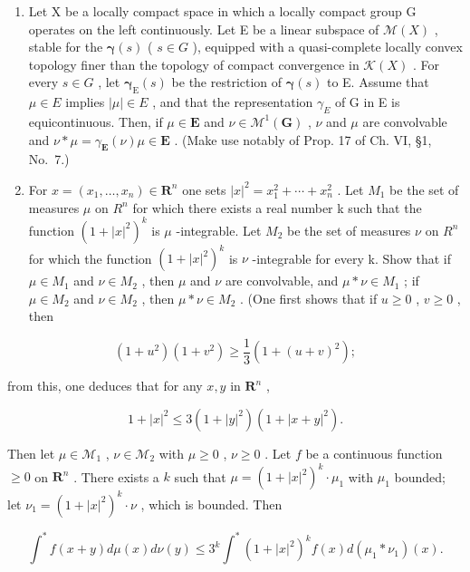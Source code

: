 \begin{enumerate}
\def\labelenumi{\arabic{enumi})}
\setcounter{enumi}{1}
\item
  Let X be a locally compact space in which a locally compact group G operates on the left continuously. Let E be a linear subspace of \(\mathcal{M}(X)\) , stable for the \(\boldsymbol{\gamma}(s)\) ( \(s \in G\) ), equipped with a quasi-complete locally convex topology finer than the topology of compact convergence in \(\mathcal{K}(X)\) . For every \(s \in G\) , let \(\boldsymbol{\gamma}_{\mathrm{E}}(s)\) be the restriction of \(\boldsymbol{\gamma}(s)\) to E. Assume that \(\mu \in E\) implies \(|\mu| \in E\) , and that the representation \(\gamma_{E}\) of G in E is equicontinuous. Then, if \(\mu \in \mathbf{E}\) and \(\nu \in \mathcal{M}^1 (\mathbf{G})\) , \(\nu\) and \(\mu\) are convolvable and \(\nu * \mu = \gamma_{\mathbf{E}}(\nu)\mu \in \mathbf{E}\) . (Make use notably of Prop. 17 of Ch. VI, §1, No.~7.)
\item
  For \(x = (x_{1}, \ldots, x_{n}) \in \mathbf{R}^{n}\) one sets \(|x|^{2} = x_{1}^{2} + \cdots + x_{n}^{2}\) . Let \(M_{1}\) be the set of measures \(\mu\) on \(R^{n}\) for which there exists a real number k such that the function \((1 + |x|^{2})^{k}\) is \(\mu\) -integrable. Let \(M_{2}\) be the set of measures \(\nu\) on \(R^{n}\) for which the function \((1 + |x|^{2})^{k}\) is \(\nu\) -integrable for every k. Show that if \(\mu \in M_{1}\) and \(\nu \in M_{2}\) , then \(\mu\) and \(\nu\) are convolvable, and \(\mu * \nu \in M_{1}\) ; if \(\mu \in M_{2}\) and \(\nu \in M_{2}\) , then \(\mu * \nu \in M_{2}\) . (One first shows that if \(u \geqslant 0\) , \(v \geqslant 0\) , then
\end{enumerate}

\[
(1 + u ^ {2}) (1 + v ^ {2}) \geqslant \frac {1}{3} (1 + (u + v) ^ {2});
\]

from this, one deduces that for any \(x, y\) in \(\mathbf{R}^n\) ,

\[
1 + | x | ^ {2} \leqslant 3 (1 + | y | ^ {2}) (1 + | x + y | ^ {2}).
\]

Then let \(\mu \in \mathcal{M}_1\) , \(\nu \in \mathcal{M}_2\) with \(\mu \geqslant 0\) , \(\nu \geqslant 0\) . Let \(f\) be a continuous function \(\geqslant 0\) on \(\mathbf{R}^n\) . There exists a \(k\) such that \(\mu = (1 + |x|^2)^k \cdot \mu_1\) with \(\mu_1\) bounded; let \(\nu_1 = (1 + |x|^2)^k \cdot \nu\) , which is bounded. Then

\[
\int^ {*} f (x + y) d \mu (x) d \nu (y) \leqslant 3 ^ {k} \int^ {*} (1 + | x | ^ {2}) ^ {k} f (x) d (\mu_ {1} * \nu_ {1}) (x).
\]

